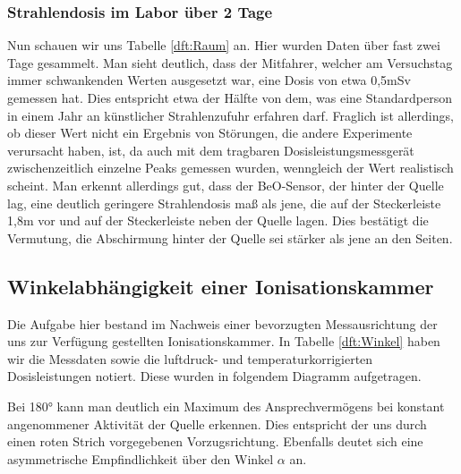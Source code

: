 \subsubsection{Strahlendosis im Labor über 2 Tage}
Nun schauen wir uns Tabelle \ref{dft:Raum} an. Hier wurden Daten über fast zwei Tage gesammelt. Man sieht 
deutlich, dass der Mitfahrer, welcher am Versuchstag immer schwankenden Werten ausgesetzt war, eine Dosis von 
etwa 0,5mSv gemessen hat. Dies entspricht etwa der Hälfte von dem, was eine Standardperson in einem Jahr an 
künstlicher Strahlenzufuhr erfahren darf. Fraglich ist allerdings, ob dieser Wert nicht ein Ergebnis von Störungen, 
die andere Experimente verursacht haben, ist, da auch mit dem tragbaren Dosisleistungsmessgerät zwischenzeitlich einzelne Peaks gemessen wurden, wenngleich der Wert realistisch scheint.
Man erkennt allerdings gut, dass der BeO-Sensor, der hinter der Quelle lag, eine deutlich geringere Strahlendosis maß als jene, die auf der Steckerleiste 1,8m vor und auf der Steckerleiste neben der Quelle lagen. Dies bestätigt die Vermutung, die Abschirmung hinter der Quelle sei stärker als jene an den Seiten.

\subsection{Winkelabhängigkeit einer Ionisationskammer}
    Die Aufgabe hier bestand im Nachweis einer bevorzugten Messausrichtung der uns zur Verfügung gestellten Ionisationskammer. In Tabelle \ref{dft:Winkel} haben wir die Messdaten sowie die luftdruck- und temperaturkorrigierten Dosisleistungen notiert.
    Diese wurden in folgendem Diagramm aufgetragen.

    \begin{center}
        \minipanf
                \makebox[\textwidth]{} %
                \label{auswd:Winkel}
        \minipend
    \end{center}
    \vspace{3mm}
    Bei 180° kann man deutlich ein Maximum des Ansprechvermögens bei konstant angenommener Aktivität der Quelle erkennen. Dies entspricht der uns durch einen roten Strich vorgegebenen Vorzugsrichtung. Ebenfalls deutet sich eine asymmetrische Empfindlichkeit über den Winkel $\alpha$ an. 



